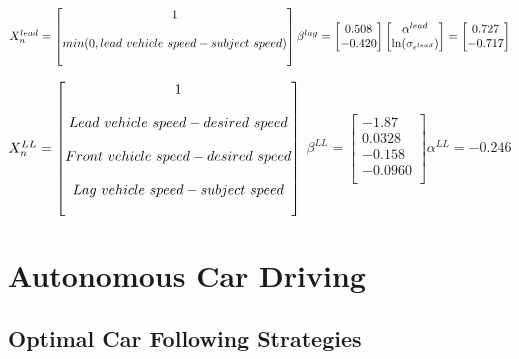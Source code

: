 $\noindent X_n^{lead} = \begin{bmatrix}
    1 \\ \\
    min(0, lead\ vehicle\ speed - subject\ speed)  \\ \\
\end{bmatrix}
\beta^{lag} = \begin{bmatrix}
    0.508\\
     -0.420\\
\end{bmatrix}
\begin{bmatrix}
    \alpha^{lead} \\
    \ln(\sigma_{\epsilon^{lead}})\\
\end{bmatrix} = \begin{bmatrix}
    0.727 \\
    -0.717 \\
\end{bmatrix}
$

$\noindent X_n^{LL} = \begin{bmatrix}
    1 \\ \\
    Lead\ vehicle\ speed - desired\ speed  \\ \\
    Front\ vehicle\ speed - desired\ speed  \\ \\
    Lag\ vehicle\ speed - subject\ speed  \\ \\
\end{bmatrix}
$
$
\beta^{LL} = \begin{bmatrix}
    -1.87\\
    0.0328\\
    -0.158\\
    -0.0960\\
\end{bmatrix}
    \alpha^{LL} = -0.246 
$

\chapter{Autonomous Car Driving}
\thispagestyle{fancy} %
\section{Optimal Car Following Strategies}

